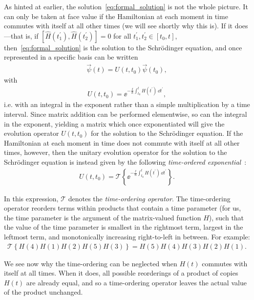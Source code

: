 As hinted at earlier, the solution~\eqref{eq:formal_solution} is not the whole picture. It can only be taken at face value if the Hamiltonian at each moment in time commutes with itself at all other times (we will see shortly why this is). If it does---that is, if $[\hat H(t_1^\prime), \hat H(t_2^\prime)] = 0$ for all $t^\prime_1, t^\prime_2 \in [t_0, t]$, then~\eqref{eq:formal_solution} is the solution to the Schr\"odinger equation, and once represented in a specific basis can be written
\begin{align}
\vec \psi(t) = U(t, t_0) \vec \psi(t_0),
\end{align}
with
\begin{align}
U(t, t_0) = \ee^{-\frac \ii \hbar \int_{t_0}^t H(t^\prime)\,\dd t^\prime},
\end{align}
i.e. with an integral in the exponent rather than a simple multiplication by a time interval. Since matrix addition can be performed elementwise, so can the integral in the exponent, yielding a matrix which once exponentiated will give the evolution operator $U(t, t_0)$ for the solution to the Schr\"odinger equation. If the Hamiltonian at each moment in time does not commute with itself at all other times, however, then the unitary evolution operator for the solution to the Schr\"odinger equation is instead given by the following \emph{time-ordered exponential}~\cite[p.~193]{tannor_introduction_2007}:
\begin{align}\label{eq:time_ordered_exponential}
U(t, t_0) = \mathcal{T}\left\{\ee^{-\frac \ii \hbar \int_{t_0}^t H(t^\prime)\,\dd t^\prime}\right\}.
\end{align}

In this expression, $\mathcal{T}$ denotes the \emph{time-ordering operator}. The time-ordering operator reorders terms within products that contain a time parameter (for us, the time parameter is the argument of the matrix-valued function $H$), such that the value of the time parameter is smallest in the rightmost term, largest in the leftmost term, and monotonically increasing right-to-left in between. For example:
\begin{align}
\mathcal{T}\left\{H(4)H(1)H(2)H(5)H(3)\right\} = H(5)H(4)H(3)H(2)H(1).
\end{align}

We see now why the time-ordering can be neglected when $H(t)$ commutes with itself at all times. When it does, all possible reorderings of a product of copies $H(t)$ are already equal, and so a time-ordering operator leaves the actual value of the product unchanged.


